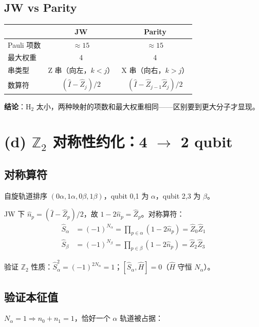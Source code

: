 \documentclass[11pt,a4paper]{article}
\begin{document}
\subsection{JW vs Parity}

\begin{center}
\begin{tabular}{lcc}
  \toprule
  & JW & Parity \\
  \midrule
  Pauli 项数 & $\approx 15$ & $\approx 15$ \\
  最大权重 & 4 & 4 \\
  串类型 & Z 串（向左，$k<j$） & X 串（向右，$k>j$） \\
  数算符 & $(\hat{I}-\hat{Z}_j)/2$ & $(\hat{I}-\hat{Z}_{j-1}\hat{Z}_j)/2$ \\
  \bottomrule
\end{tabular}
\end{center}

\textbf{结论}：H$_2$ 太小，两种映射的项数和最大权重相同——区别要到更大分子才显现。

\section{(d) $\mathbb{Z}_2$ 对称性约化：4 $\to$ 2 qubit}

\subsection{对称算符}

自旋轨道排序 $(0\alpha, 1\alpha, 0\beta, 1\beta)$，qubit 0,1 为 $\alpha$，qubit 2,3 为 $\beta$。

JW 下 $\hat{n}_p = (\hat{I}-\hat{Z}_p)/2$，故 $1-2\hat{n}_p = \hat{Z}_p$。对称算符：
\begin{align}
  \hat{S}_\alpha &= (-1)^{N_\alpha} = \prod_{p\in\alpha}(1-2\hat{n}_p) = \hat{Z}_0\hat{Z}_1 \\
  \hat{S}_\beta &= (-1)^{N_\beta} = \prod_{p\in\beta}(1-2\hat{n}_p) = \hat{Z}_2\hat{Z}_3
\end{align}

验证 $\mathbb{Z}_2$ 性质：$\hat{S}_\alpha^2 = (-1)^{2N_\alpha} = 1$；$[\hat{S}_\alpha, \hat{H}] = 0$（$\hat{H}$ 守恒 $N_\alpha$）。

\subsection{验证本征值}

$N_\alpha = 1 \Rightarrow n_0 + n_1 = 1$，恰好一个 $\alpha$ 轨道被占据：
\end{document}
